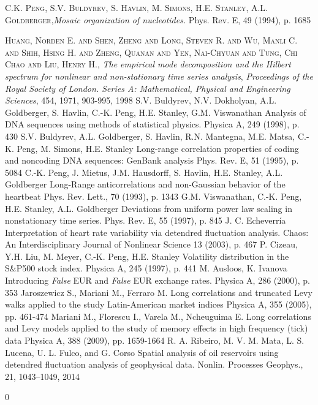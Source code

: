 \documentclass[onecolumn, preprint,aps,amsmath, amssymb, superscriptaddress]{revtex4}
\begin{document}
\begin{thebibliography}{99}
 \textsc{C.K. Peng, S.V. Buldyrev, S. Havlin, M. Simons, H.E. Stanley, A.L. Goldberger},\textit{Mosaic organization of nucleotides.} Phys. Rev. E, 49 (1994), p. 1685

 \textsc{Huang, Norden E.  and Shen, Zheng  and Long, Steven R.  and Wu, Manli C.  and Shih, Hsing H.  and Zheng, Quanan  and Yen, Nai-Chyuan  and Tung, Chi Chao  and Liu, Henry H.}, \textit{The empirical mode decomposition and the Hilbert spectrum for nonlinear and non-stationary time series analysis}, \textit{Proceedings of the Royal Society of London. Series A: Mathematical, Physical and Engineering Sciences}, 454, 1971, 903-995, 1998
S.V. Buldyrev, N.V. Dokholyan, A.L. Goldberger, S. Havlin, C.-K. Peng, H.E. Stanley, G.M. Viswanathan
Analysis of DNA sequences using methods of statistical physics.
Physica A, 249 (1998), p. 430
S.V. Buldyrev, A.L. Goldberger, S. Havlin, R.N. Mantegna, M.E. Matsa, C.-K. Peng, M. Simons, H.E. Stanley
Long-range correlation properties of coding and noncoding DNA sequences: GenBank analysis
Phys. Rev. E, 51 (1995), p. 5084
C.-K. Peng, J. Mietus, J.M. Hausdorff, S. Havlin, H.E. Stanley, A.L. Goldberger
Long-Range anticorrelations and non-Gaussian behavior of the heartbeat
Phys. Rev. Lett., 70 (1993), p. 1343
G.M. Viswanathan, C.-K. Peng, H.E. Stanley, A.L. Goldberger
Deviations from uniform power law scaling in nonstationary time series.
Phys. Rev. E, 55 (1997), p. 845
J. C. Echeverr\'ia
Interpretation of heart rate variability via detendred fluctuation analysis.
Chaos: An Interdisciplinary Journal of Nonlinear Science 13 (2003), p. 467
P. Cizeau, Y.H. Liu, M. Meyer, C.-K. Peng, H.E. Stanley
Volatility distribution in the S\&P500 stock index.
Physica A, 245 (1997), p. 441
M. Ausloos, K. Ivanova
Introducing \textit{False} EUR and \textit{False} EUR exchange rates.
Physica A, 286 (2000), p. 353
Jaroszewicz S., Mariani M., Ferraro M.
Long correlations and truncated Levy walks applied to the study Latin-American market indices
Physica A, 355 (2005), pp. 461-474
Mariani M., Florescu I., Varela M., Ncheuguima E.
Long correlations and Levy models applied to the study of memory effects in high frequency (tick) data
Physica A, 388 (2009), pp. 1659-1664
R. A. Ribeiro, M. V. M. Mata, L. S. Lucena, U. L. Fulco, and G. Corso
Spatial analysis of oil reservoirs using detendred fluctuation analysis of geophysical data.
Nonlin. Processes Geophys., 21, 1043–1049, 2014

\end{thebibliography}0
\end{document}
